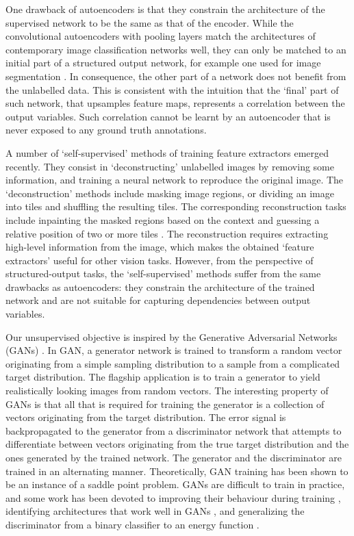 \documentclass[a4paper]{article}
\begin{document}
One drawback of autoencoders is that they constrain the architecture of the supervised network to be the same as that of the encoder. While the convolutional autoencoders \cite{Masci11} with pooling layers \cite{Ranzato2007,Zeiler2011,Zhang2016} match the architectures of contemporary image classification networks \cite{vgg} well, they can only be matched to an initial part of a structured output network, for example one used for image segmentation \cite{conv_deconv,segnet}. In consequence, the other part of a network does not benefit from the unlabelled data. This is consistent with the intuition that the `final' part of such network, that upsamples feature maps, represents a correlation between the output variables. Such correlation cannot be learnt by an autoencoder that is never exposed to any ground truth annotations. 

A number of `self-supervised' methods of training feature extractors \cite{Doersch2015,Pathak2016,Noroozi2016} emerged recently. They consist in `deconstructing' unlabelled images by removing some information, and training a neural network to reproduce the original image. The `deconstruction' methods include masking image regions, or dividing an image into tiles and shuffling the resulting tiles. The corresponding reconstruction tasks include inpainting the masked regions based on the context \cite{Pathak2016} and guessing a relative position of two or more tiles \cite{Doersch2015,Noroozi2016}. The reconstruction requires extracting high-level information from the image, which makes the obtained `feature extractors' useful for other vision tasks. However, from the perspective of structured-output tasks, the `self-supervised' methods suffer from the same drawbacks as autoencoders: they constrain the architecture of the trained network and are not suitable for capturing dependencies between output variables.

Our unsupervised objective is inspired by the Generative Adversarial Networks (GANs) \cite{Goodfellow2014}. In GAN, a generator network is trained to transform a random vector originating from a simple sampling distribution to a sample from a complicated target distribution. The flagship application is to train a generator to yield realistically looking images from random vectors. The interesting property of GANs is that all that is required for training the generator is a collection of vectors originating from the target distribution. The error signal is backpropagated to the generator from a discriminator network that attempts to differentiate between vectors originating from the true target distribution and the ones generated by the trained network. The generator and the discriminator are trained in an alternating manner. Theoretically, GAN training has been shown to be an instance of a saddle point problem. GANs are difficult to train in practice, and some work has been devoted to improving their behaviour during training \cite{Salimans2016}, identifying architectures that work well in GANs \cite{Radford2015}, and generalizing the discriminator from a binary classifier to an energy function \cite{ebgan}.
\end{document}
